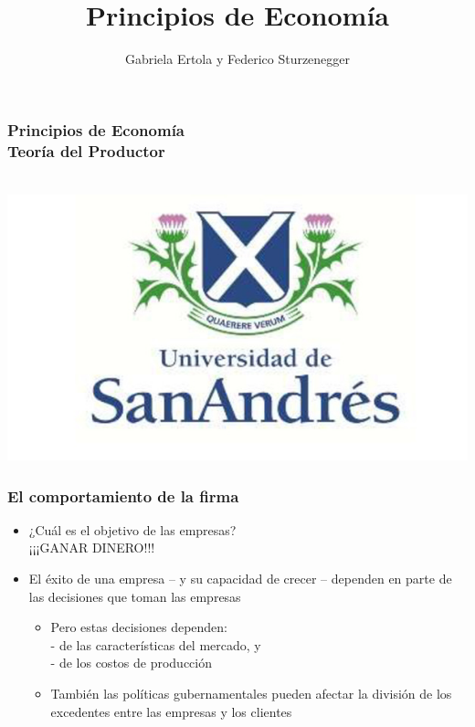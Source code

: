 \documentclass{beamer}
\title[Principios de Economía]{Principios de Economía}
\date{}
\author[Ertola y Sturzenegger]{Gabriela Ertola y Federico Sturzenegger }
\institute[]{Universidad de San Andrés \\
2022}
\begin{document}
\begin{frame}
\frametitle{Principios de Economía
\centering
\\ \vspace{12mm} Teoría del Productor}
\centering
 \\ \vspace{12mm} %
\includegraphics[scale=0.25]{Figures/logoUDESA.jpg} 
\end{frame}

\begin{frame}
\frametitle{ El comportamiento de la firma}
\begin{itemize}
    \item ¿Cuál es el objetivo de las empresas? \vspace{2mm} \\
    \hspace{18mm} ¡¡¡GANAR DINERO!!! \vspace{2mm} \\
    \item El éxito de una empresa – y su capacidad de crecer – dependen en parte de las decisiones que toman las empresas
    \begin{itemize}
        \item Pero estas decisiones dependen: \\
        - de las características del mercado, y \\
        - de los costos de producción
        \item También las políticas gubernamentales pueden afectar la división de los excedentes entre las empresas y los clientes
    \end{itemize}    
\end{itemize}    
\end{frame}
\end{document}
